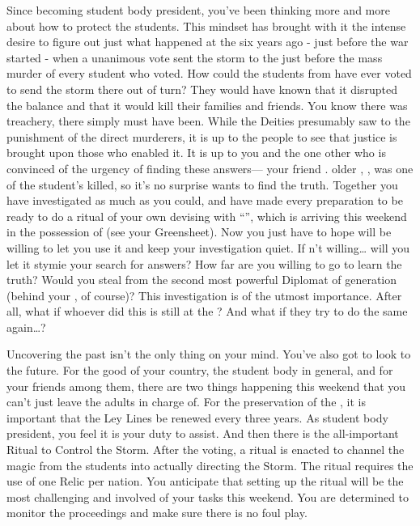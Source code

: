 \documentclass[char]{GL2020}
\begin{document}
Since becoming student body president, you've been thinking more and more about how to protect the students. This mindset has brought with it the intense desire to figure out just what happened at the \pSc{} six years ago - just before the war started - when a unanimous vote sent the storm to the \pShip{} just before the mass murder of every student who voted. How could the students from \pShip{} have ever voted to send the storm there out of turn? They would have known that it disrupted the balance and that it would kill their families and friends. You know there was treachery, there simply must have been. While the Deities presumably saw to the punishment of the direct murderers, it is up to the people to see that justice is brought upon those who enabled it. It is up to you and the one other who is convinced of the urgency of finding these answers— your friend \cHeir{\full}. \cHeir{\Their} older \cHeirSibling{\sibling}, \cHeirSibling{\full}, was one of the student's killed, so it's no surprise \cHeir{} wants to find the truth. Together you have investigated as much as you could, and have made every preparation to be ready to do a ritual of your own devising with ``\iMirror{}'', which is arriving this weekend in the possession of \cDiplomat{\full} (see your Greensheet). Now you just have to hope \cDiplomat{\they} will be willing to let you use it and keep your investigation quiet. If \cDiplomat{\they} \cDiplomat{\are}n't willing\ldots{} will you let it stymie your search for answers? How far are you willing to go to learn the truth? Would you steal from the second most powerful Diplomat of \cDiplomat{\their} generation (behind your \cHeadDiplomat{\Auncle} \cHeadDiplomat{\full}, of course)? This investigation is of the utmost importance. After all, what if whoever did this is still at the \pSc{}? And what if they try to do the same again\dots{}?

Uncovering the past isn't the only thing on your mind. You've also got to look to the future. For the good of your country, the student body in general, and for your friends among them, there are two things happening this weekend that you can't just leave the adults in charge of. For the preservation of the \pSc{}, it is important that the Ley Lines be renewed every three years. As student body president, you feel it is your duty to assist. And then there is the all-important Ritual to Control the Storm. After the voting, a ritual is enacted to channel the magic from the students into actually directing the Storm. The ritual requires the use of one Relic per nation. You anticipate that setting up the ritual will be the most challenging and involved of your tasks this weekend. You are determined to monitor the proceedings and make sure there is no foul play.
\end{document}
